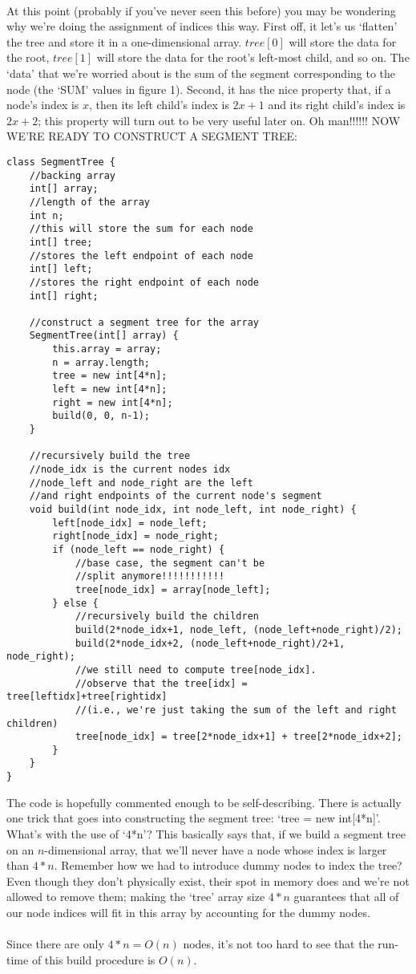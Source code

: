 \documentclass[11pt]{article}
\theoremstyle{plain}
\theoremstyle{definition}
\begin{document}
\\ \noindent At this point (probably if you've never seen this before) you may be wondering why we're doing the assignment of indices this way. First off, it let's us `flatten' the tree and store it in a one-dimensional array. $tree[0]$ will store the data for the root, $tree[1]$ will store the data for the root's left-most child, and so on. The `data' that we're worried about is the sum of the segment corresponding to the node (the `SUM' values in figure 1). Second, it has the nice property that, if a node's index is $x$, then its left child's index is $2x+1$ and its right child's index is $2x+2$; this property will turn out to be very useful later on. Oh man!!!!!! NOW WE'RE READY TO CONSTRUCT A SEGMENT TREE:
\begin{lstlisting}
class SegmentTree {
	//backing array
	int[] array;
	//length of the array
	int n;
	//this will store the sum for each node
	int[] tree;
	//stores the left endpoint of each node
	int[] left;
	//stores the right endpoint of each node
	int[] right;
	
	//construct a segment tree for the array
	SegmentTree(int[] array) {
		this.array = array;
		n = array.length;
		tree = new int[4*n];
		left = new int[4*n];
		right = new int[4*n];
		build(0, 0, n-1);
	}

	//recursively build the tree
	//node_idx is the current nodes idx
	//node_left and node_right are the left
	//and right endpoints of the current node's segment
	void build(int node_idx, int node_left, int node_right) {
		left[node_idx] = node_left;
		right[node_idx] = node_right;
		if (node_left == node_right) {
			//base case, the segment can't be
			//split anymore!!!!!!!!!!!
			tree[node_idx] = array[node_left];
		} else {
			//recursively build the children
			build(2*node_idx+1, node_left, (node_left+node_right)/2);
			build(2*node_idx+2, (node_left+node_right)/2+1, node_right);
			//we still need to compute tree[node_idx].
			//observe that the tree[idx] = tree[leftidx]+tree[rightidx]
			//(i.e., we're just taking the sum of the left and right children)
			tree[node_idx] = tree[2*node_idx+1] + tree[2*node_idx+2];
		}
	}
}
\end{lstlisting}
\newpage \noindent
The code is hopefully commented enough to be self-describing. There is actually one trick that goes into constructing the segment tree: `tree = new int[4*n]'. What's with the use of `4*n'? This basically says that, if we build a segment tree on an $n$-dimensional array, that we'll never have a node whose index is larger than $4*n$. Remember how we had to introduce dummy nodes to index the tree? Even though they don't physically exist, their spot in memory does and we're not allowed to remove them; making the `tree' array size $4*n$ guarantees that all of our node indices will fit in this array by accounting for the dummy nodes. \\\\ 
Since there are only $4*n = O(n)$ nodes, it's not too hard to see that the run-time of this build procedure is $O(n)$.
\end{document}
